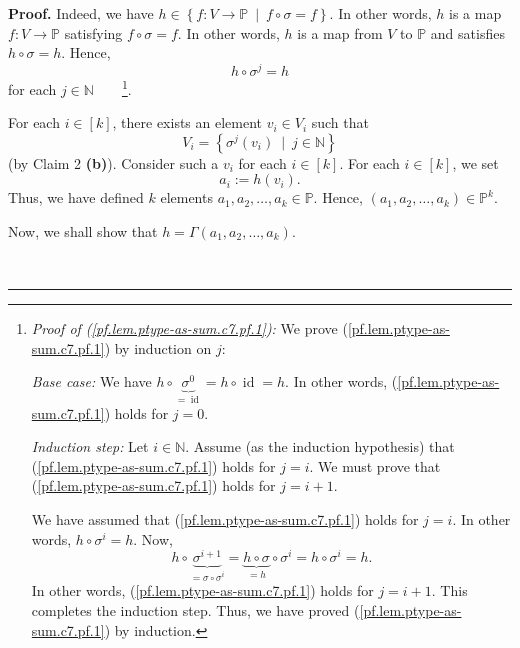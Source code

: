 \documentclass[numbers=enddot,12pt,final,onecolumn,notitlepage]{scrartcl}%
\numberwithin{exer}{section}
\theoremstyle{definition}
\newenvironment{proof}[1][Proof]{\noindent\textbf{#1.} }{\ \rule{0.5em}{0.5em}}
\newenvironment{verlong}{}{}
\begin{document}
\begin{verlong}
\begin{proof}
Indeed, we have $h\in\left\{  f:V\rightarrow\mathbb{P}\ \mid\ f\circ
\sigma=f\right\}  $. In other words, $h$ is a map $f:V\rightarrow\mathbb{P}$
satisfying $f\circ\sigma=f$. In other words, $h$ is a map from $V$ to
$\mathbb{P}$ and satisfies $h\circ\sigma=h$. Hence,
\begin{equation}
h\circ\sigma^{j}=h \label{pf.lem.ptype-as-sum.c7.pf.1}%
\end{equation}
for each $j\in\mathbb{N}$\ \ \ \ \footnote{\textit{Proof of
(\ref{pf.lem.ptype-as-sum.c7.pf.1}):} We prove
(\ref{pf.lem.ptype-as-sum.c7.pf.1}) by induction on $j$:
\par
\textit{Base case:} We have $h\circ\underbrace{\sigma^{0}}%
_{=\operatorname*{id}}=h\circ\operatorname*{id}=h$. In other words,
(\ref{pf.lem.ptype-as-sum.c7.pf.1}) holds for $j=0$.
\par
\textit{Induction step:} Let $i\in\mathbb{N}$. Assume (as the induction
hypothesis) that (\ref{pf.lem.ptype-as-sum.c7.pf.1}) holds for $j=i$. We must
prove that (\ref{pf.lem.ptype-as-sum.c7.pf.1}) holds for $j=i+1$.
\par
We have assumed that (\ref{pf.lem.ptype-as-sum.c7.pf.1}) holds for $j=i$. In
other words, $h\circ\sigma^{i}=h$. Now,%
\[
h\circ\underbrace{\sigma^{i+1}}_{=\sigma\circ\sigma^{i}}=\underbrace{h\circ
\sigma}_{=h}\circ\sigma^{i}=h\circ\sigma^{i}=h.
\]
In other words, (\ref{pf.lem.ptype-as-sum.c7.pf.1}) holds for $j=i+1$. This
completes the induction step. Thus, we have proved
(\ref{pf.lem.ptype-as-sum.c7.pf.1}) by induction.}.

For each $i\in\left[  k\right]  $, there exists an element $v_{i}\in V_{i}$
such that%
\begin{equation}
V_{i}=\left\{  \sigma^{j}\left(  v_{i}\right)  \ \mid\ j\in\mathbb{N}\right\}
\label{pf.lem.ptype-as-sum.c7.pf.2}%
\end{equation}
(by Claim 2 \textbf{(b)}). Consider such a $v_{i}$ for each $i\in\left[
k\right]  $. For each $i\in\left[  k\right]  $, we set
\[
a_{i}:=h\left(  v_{i}\right)  .
\]
Thus, we have defined $k$ elements $a_{1},a_{2},\ldots,a_{k}\in\mathbb{P}$.
Hence, $\left(  a_{1},a_{2},\ldots,a_{k}\right)  \in\mathbb{P}^{k}$.

Now, we shall show that $h=\Gamma\left(  a_{1},a_{2},\ldots,a_{k}\right)  $.


\end{proof}
\end{verlong}
\end{document}
